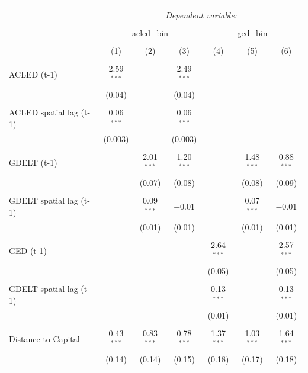 \documentclass[hidelinks]{article}
\begin{document}
\newpage
\begin{table}[!htbp] \centering 
  \caption{} 
  \label{} 
\begin{tabular}{@{\extracolsep{5pt}}lcccccc} 
\\[-1.8ex]\hline 
\hline \\[-1.8ex] 
 & \multicolumn{6}{c}{\textit{Dependent variable:}} \\ 
\cline{2-7} 
\\[-1.8ex] & \multicolumn{3}{c}{acled\_bin} & \multicolumn{3}{c}{ged\_bin} \\ 
\\[-1.8ex] & (1) & (2) & (3) & (4) & (5) & (6)\\ 
\hline \\[-1.8ex] 
ACLED (t-1) & 2.59$^{***}$ &  & 2.49$^{***}$ &  &  &  \\ 
  & (0.04) &  & (0.04) &  &  &  \\ 
  & & & & & & \\ 
ACLED spatial lag (t-1) & 0.06$^{***}$ &  & 0.06$^{***}$ &  &  &  \\ 
  & (0.003) &  & (0.003) &  &  &  \\ 
  & & & & & & \\ 
GDELT (t-1) &  & 2.01$^{***}$ & 1.20$^{***}$ &  & 1.48$^{***}$ & 0.88$^{***}$ \\ 
  &  & (0.07) & (0.08) &  & (0.08) & (0.09) \\ 
  & & & & & & \\ 
GDELT spatial lag (t-1) &  & 0.09$^{***}$ & $-$0.01 &  & 0.07$^{***}$ & $-$0.01 \\ 
  &  & (0.01) & (0.01) &  & (0.01) & (0.01) \\ 
  & & & & & & \\ 
GED (t-1) &  &  &  & 2.64$^{***}$ &  & 2.57$^{***}$ \\ 
  &  &  &  & (0.05) &  & (0.05) \\ 
  & & & & & & \\ 
GDELT spatial lag (t-1) &  &  &  & 0.13$^{***}$ &  & 0.13$^{***}$ \\ 
  &  &  &  & (0.01) &  & (0.01) \\ 
  & & & & & & \\ 
Distance to Capital & 0.43$^{***}$ & 0.83$^{***}$ & 0.78$^{***}$ & 1.37$^{***}$ & 1.03$^{***}$ & 1.64$^{***}$ \\ 
  & (0.14) & (0.14) & (0.15) & (0.18) & (0.17) & (0.18) \\ 

\end{tabular}
\end{table}
\end{document}
